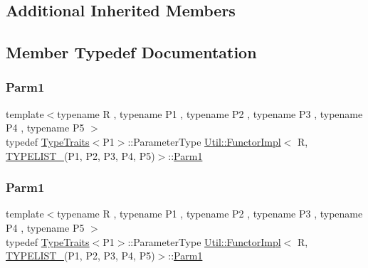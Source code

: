 \subsection*{Additional Inherited Members}


\subsection{Member Typedef Documentation}
\mbox{\label{classUtil_1_1FunctorImpl_3_01R_00_01TYPELIST__5_07P1_00_01P2_00_01P3_00_01P4_00_01P5_08_4_abeccc1e3199db67f0637ce1fc9b08a32}} 
\subsubsection{\texorpdfstring{Parm1}{Parm1}\hspace{0.1cm}{\footnotesize\ttfamily [1/2]}}
{\footnotesize\ttfamily template$<$typename R , typename P1 , typename P2 , typename P3 , typename P4 , typename P5 $>$ \\
typedef \mbox{\hyperlink{classUtil_1_1TypeTraits}{Type\+Traits}}$<$P1$>$\+::Parameter\+Type \mbox{\hyperlink{classUtil_1_1FunctorImpl}{Util\+::\+Functor\+Impl}}$<$ R, \mbox{\hyperlink{install_2include_2adat_2typelist_8h_aad5d9b3c82c8503c85c625acd41c0a2f}{T\+Y\+P\+E\+L\+I\+S\+T\+\_}}(P1, P2, P3, P4, P5)$>$\+::\mbox{\hyperlink{structUtil_1_1Private_1_1FunctorImplBase_a9d61e693d6c616dea5bd9d9073c7d21a}{Parm1}}}

\mbox{\label{classUtil_1_1FunctorImpl_3_01R_00_01TYPELIST__5_07P1_00_01P2_00_01P3_00_01P4_00_01P5_08_4_abeccc1e3199db67f0637ce1fc9b08a32}} 
\subsubsection{\texorpdfstring{Parm1}{Parm1}\hspace{0.1cm}{\footnotesize\ttfamily [2/2]}}
{\footnotesize\ttfamily template$<$typename R , typename P1 , typename P2 , typename P3 , typename P4 , typename P5 $>$ \\
typedef \mbox{\hyperlink{classUtil_1_1TypeTraits}{Type\+Traits}}$<$P1$>$\+::Parameter\+Type \mbox{\hyperlink{classUtil_1_1FunctorImpl}{Util\+::\+Functor\+Impl}}$<$ R, \mbox{\hyperlink{install_2include_2adat_2typelist_8h_aad5d9b3c82c8503c85c625acd41c0a2f}{T\+Y\+P\+E\+L\+I\+S\+T\+\_}}(P1, P2, P3, P4, P5)$>$\+::\mbox{\hyperlink{structUtil_1_1Private_1_1FunctorImplBase_a9d61e693d6c616dea5bd9d9073c7d21a}{Parm1}}}

